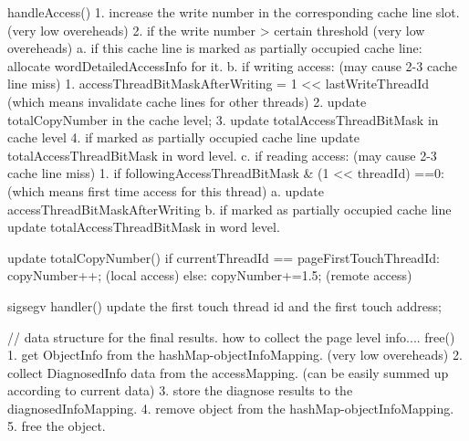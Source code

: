         handleAccess(){
            1. increase the write number in the corresponding cache line slot.  (very low overeheads)
            2. if the write number > certain threshold                          (very low overeheads)
                      a. if this cache line is marked as partially occupied cache line:
                            allocate wordDetailedAccessInfo for it.
                      b. if writing access:                  (may cause 2-3 cache line miss)
                            1. accessThreadBitMaskAfterWriting = 1 << lastWriteThreadId (which means invalidate cache lines for other threads)
                            2. update totalCopyNumber in the cache level;
                            3. update totalAccessThreadBitMask in cache level
                            4. if marked as partially occupied cache line
                                    update totalAccessThreadBitMask in word level.
                      c. if reading access:                   (may cause 2-3 cache line miss)
                            1. if followingAccessThreadBitMask & (1 << threadId) ==0: (which means first time access for this thread)
                                    a. update accessThreadBitMaskAfterWriting
                                    b. if marked as partially occupied cache line
                                            update totalAccessThreadBitMask in word level.
        }

        update totalCopyNumber() {
            if currentThreadId == pageFirstTouchThreadId:
                    copyNumber++;    (local access)
            else:
                    copyNumber+=1.5;  (remote access)
        }

        sigsegv handler() {
            update the first touch thread id and the first touch address;
        }

        // data structure for the final results. how to collect the page level info....
        free() {
            1. get ObjectInfo from the hashMap-objectInfoMapping. (very low overeheads)
            2. collect DiagnosedInfo data from the accessMapping. (can be easily summed up according to current data)
            3. store the diagnose results to the diagnosedInfoMapping.
            4. remove object from the hashMap-objectInfoMapping.
            5. free the object.
        }
